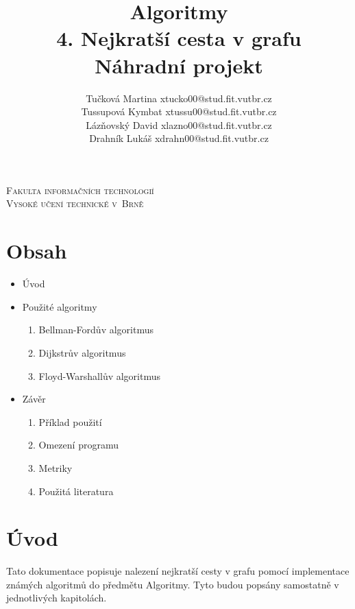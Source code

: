 \documentclass[a4paper,11pt]{article}
\begin{document}
\begin{center}
\textsc{\Huge Fakulta informačních technologií\\
Vysoké učení technické v~Brně\\}

\LARGE \title{Algoritmy\\
\textbf{4. Nejkratší cesta v grafu\\}
Náhradní projekt\\}


\hfill \author{Tučková Martina xtucko00@stud.fit.vutbr.cz\\
 Tussupová Kymbat xtussu00@stud.fit.vutbr.cz\\
 Lázňovský David xlazno00@stud.fit.vutbr.cz\\
 Drahník Lukáš xdrahn00@stud.fit.vutbr.cz}
\end{center}


{\let\newpage\relax\maketitle}

\newpage

\section*{Obsah}
\begin{itemize}
  \item Úvod
  \item Použité algoritmy
  \begin{enumerate}
  \item Bellman-Fordův algoritmus
  \item Dijkstrův algoritmus
  \item Floyd-Warshallův algoritmus
  \end{enumerate}
  \item Závěr
  \begin{enumerate}
  \item Příklad použití
  \item Omezení programu
  \item Metriky
  \item Použitá literatura
  \end{enumerate}
\end{itemize}

\newpage

\section*{Úvod}
Tato dokumentace popisuje nalezení nejkratší cesty v grafu pomocí implementace známých algoritmů do předmětu Algoritmy.  Tyto budou popsány samostatně v jednotlivých kapitolách.
\end{document}
